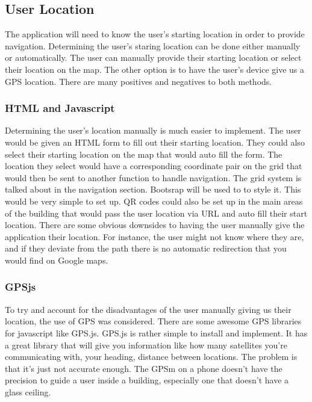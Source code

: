\documentclass[letterpaper,10pt,titlepage, onecolumn, compsoc]{IEEEtran}
\begin{document}
\subsection{User Location}
	The application will need to know the user’s starting location in order to provide navigation. Determining the user’s staring location can be done either manually or automatically. The user can manually provide their starting location or select their location on the map.  The other option is to have the user’s device give us a GPS location. There are many positives and negatives to both methods. 
    
\subsubsection{HTML and Javascript}
	Determining the user’s location manually is much easier to implement. The user would be given an HTML form to fill out their starting location. They could also select their starting location on the map that would auto fill the form. The location they select would have a corresponding coordinate pair on the grid that would then be sent to another function to handle navigation. The grid system is talked about in the navigation section. Bootsrap will be used to to style it. This would be very simple to set up.  QR codes could also be set up in the main areas of the building that would pass the user location via URL and auto fill their start location. There are some obvious downsides to having the user manually give the application their location. For instance, the user might not know where they are, and if they deviate from the path there is no automatic redirection that you would find on Google maps. 
    
\subsubsection{GPSjs}
	To try and account for the disadvantages of the user manually giving us their location, the use of GPS was considered. There are some awesome GPS libraries for javascript like GPS.js. GPS.js is rather simple to install and implement. It has a great library that will give you information like how many satellites you’re communicating with, your heading, distance between locations. The problem is that it’s just not accurate enough. The GPSm on a phone doesn’t have the precision to guide a user inside a building, especially one that doesn’t have a glass ceiling. 
\cite{GPSjs}
\end{document}
